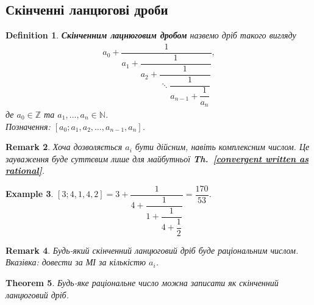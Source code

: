 \documentclass[a4paper, 14pt]{extarticle}
\theoremstyle{theoremdd}
\newtheorem{theorem}{Theorem}[subsection]
\theoremstyle{theoremdd}
\newtheorem{definition}[theorem]{Definition}
\theoremstyle{theoremdd}
\theoremstyle{theoremdd}
\newtheorem{example}[theorem]{Example}
\theoremstyle{theoremdd}
\theoremstyle{theoremdd}
\newtheorem{remark}[theorem]{Remark}
\theoremstyle{theoremdd}
\theoremstyle{theoremdd}
\newcommand\thref[1]{\textbf{Th.~\ref{#1}}}
\begin{document}
\subsection{Скінченні ланцюгові дроби}
\begin{definition}
\textbf{Скінченним лацнюговим дробом} назвемо дріб такого вигляду
\begin{align*}
a_0 + \dfrac{1}{a_1 + \dfrac{1}{a_2 + \dfrac{1}{\ddots \dfrac{1}{a_{n-1} + \dfrac{1}{a_{n}}} }}},
\end{align*}
де $a_0 \in \mathbb{Z}$ та $a_1,\dots,a_n \in \mathbb{N}$.\\
Позначення: $[a_0;a_1,a_2,\dots,a_{n-1},a_n]$.
\end{definition}

\begin{remark}
\label{continued frac can have not only integers}
Хоча дозволяється $a_i$ бути дійсним, навіть комплексним числом. Це зауваження буде суттєвим лише для майбутньої \thref{convergent written as rational}.
\end{remark}

\begin{example}
$[3;4,1,4,2] = 3 + \dfrac{1}{4 + \dfrac{1}{1 + \dfrac{1}{4 + \dfrac{1}{2}}}} = \dfrac{170}{53}$.
\end{example}

\begin{remark}
Будь-який скінченний ланцюговий дріб буде раціональним числом.\\
\textit{Вказівка: довести за МІ за кількістю $a_i$.}
\end{remark}

\begin{theorem}
Будь-яке раціональне число можна записати як скінченний ланцюговий дріб.
\end{theorem}
\end{document}
